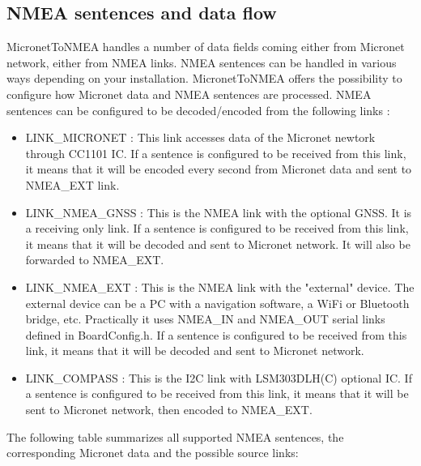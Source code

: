 \documentclass{report}
\begin{document}
\subsection{NMEA sentences and data flow}\label{supportednmeasentences}

MicronetToNMEA handles a number of data fields coming either from Micronet network, either from NMEA links.
NMEA sentences can be handled in various ways depending on your installation. MicronetToNMEA offers the possibility to configure how Micronet data and NMEA sentences are processed. NMEA sentences can be configured to be decoded/encoded from the following links :
\begin{itemize}
	\item LINK\_MICRONET : This link accesses data of the Micronet newtork through CC1101 IC. If a sentence is configured to be received from this link, it means that it will be encoded every second from Micronet data and sent to NMEA\_EXT link.
	\item LINK\_NMEA\_GNSS : This is the NMEA link with the optional GNSS. It is a receiving only link. If a sentence is configured to be received from this link, it means that it will be decoded and sent to Micronet network. It will also be forwarded to NMEA\_EXT.
	\item LINK\_NMEA\_EXT : This is the NMEA link with the "external" device. The external device can be a PC with a navigation software, a WiFi or Bluetooth bridge, etc. Practically it uses NMEA\_IN and NMEA\_OUT serial links defined in BoardConfig.h. If a sentence is configured to be received from this link, it means that it will be decoded and sent to Micronet network.
	\item LINK\_COMPASS : This is the I2C link with LSM303DLH(C) optional IC. If a sentence is configured to be received from this link, it means that it will be sent to Micronet network, then encoded to NMEA\_EXT. 
\end{itemize}

The following table summarizes all supported NMEA sentences, the corresponding Micronet data and the possible source links:
\end{document}
